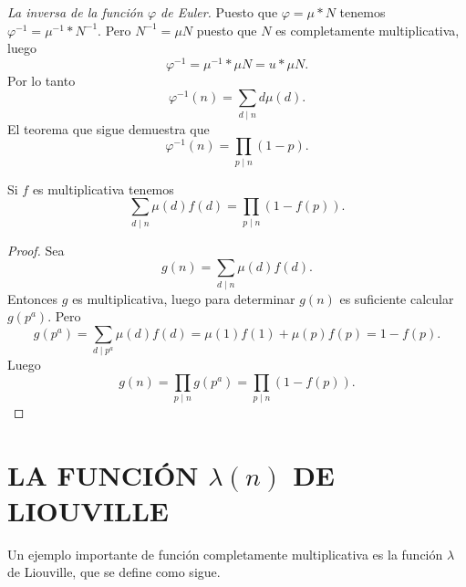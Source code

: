 \documentclass[12pt,a4paper]{book}
\begin{document}
    \begin{ejemplo}
        \textit{La inversa de la función $\varphi$ de Euler.} Puesto que $\varphi=\mu*N$
        tenemos $\varphi^{-1}=\mu^{-1}*N^{-1}$. Pero $N^{-1}=\mu N$ puesto que $N$ es
        completamente multiplicativa, luego
        \begin{equation*}
            \varphi^{-1}=\mu^{-1}*\mu N=u*\mu N.
        \end{equation*}
        Por lo tanto
        \begin{equation*}
            \varphi^{-1}(n)=\sum_{d\mid n}d\mu(d).
        \end{equation*}
        El teorema que sigue demuestra que
        \begin{equation*}
            \varphi^{-1}(n)=\prod_{p\mid n}(1-p).
        \end{equation*}
    \end{ejemplo}

    \begin{teorema}
        Si $f$ es multiplicativa tenemos
        \begin{equation*}
            \sum_{d\mid n}\mu(d)f(d)=\prod_{p\mid n}(1-f(p)).
        \end{equation*}
    \end{teorema}

    \begin{proof}
        Sea
        \begin{equation*}
            g(n)=\sum_{d\mid n}\mu(d)f(d).
        \end{equation*}
        Entonces $g$ es multiplicativa, luego para determinar $g(n)$ es suficiente calcular
        $g(p^a)$. Pero
        \begin{equation*}
            g(p^a)=\sum_{d\mid p^a}\mu(d)f(d)=\mu(1)f(1)+\mu(p)f(p)=1-f(p).
        \end{equation*}
        Luego
        \begin{equation*}
            g(n)=\prod_{p\mid n}g(p^a)=\prod_{p\mid n}(1-f(p)).
        \end{equation*}
    \end{proof}

    \section{LA FUNCIÓN \texorpdfstring{$\lambda(n)$}{λ(n)} DE LIOUVILLE}

    Un ejemplo importante de función completamente multiplicativa es la función $\lambda$
    de Liouville, que se define como sigue.
\end{document}
